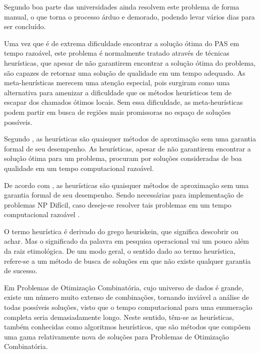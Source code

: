 Segundo \cite{souza2000} boa parte das universidades ainda resolvem este problema de forma manual, o que torna o processo árduo e demorado, podendo levar vários dias para ser concluído.\par

Uma vez que é de extrema dificuldade encontrar a solução ótima do PAS em tempo razoável, este problema é normalmente tratado através de técnicas heurísticas, que apesar de não garantirem encontrar a solução ótima do problema, são capazes de retornar uma solução de qualidade em um tempo adequado. As meta-heurísticas merecem uma atenção especial, pois surgiram como uma alternativa para amenizar a dificuldade que os métodos heurísticos tem de escapar dos chamados ótimos locais. Sem essa dificuldade, as meta-heurísticas podem partir em busca de regiões mais promissoras no espaço de soluções possíveis.\cite{kripkasimulated}\par




Segundo \cite{steiglitz1982combinatorial}, as heurísticas são quaisquer métodos de 
aproximação sem uma garantia formal de seu desempenho. As heurísticas, apesar de não garantirem encontrar a solução ótima para um problema, procuram por soluções consideradas de boa qualidade em um tempo computacional razoável.\par

De acordo com \cite{steiglitz1982combinatorial}, as heurísticas são quaisquer métodos de aproximação sem uma garantia formal de seu desempenho. Sendo necessárias para implementação de problemas NP Difícil, caso deseje-se resolver tais problemas em um tempo computacional razoável \cite{evans1992optimization}.\par

O termo heurística é derivado do grego heuriskein, que significa descobrir ou achar. Mas o significado da 
palavra em pesquisa operacional vai um pouco além da raiz etimológica. De um modo geral, o sentido dado ao termo heurística, refere-se a um método de busca de soluções em que não existe qualquer garantia de sucesso.\par


\cite{deleonardo} Em Problemas de Otimização Combinatória, cujo universo de dados é grande, existe um número muito extenso de combinações, tornando inviável a análise de todas possíveis soluções, visto que o tempo computacional para uma enumeração completa seria demasiadamente longo. Neste sentido, têm-se as heurísticas, também conhecidas como algoritmos heurísticos, que são métodos que compõem uma gama relativamente nova de soluções para Problemas de Otimização Combinatória. 


